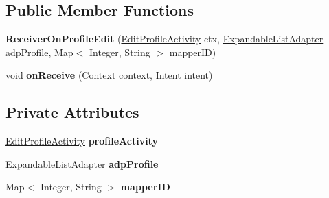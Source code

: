 \subsection*{Public Member Functions}
\begin{DoxyCompactItemize}
\item 
{\bfseries Receiver\+On\+Profile\+Edit} (\hyperlink{classcom_1_1example_1_1sebastian_1_1tindertp_1_1EditProfileActivity}{Edit\+Profile\+Activity} ctx, \hyperlink{classcom_1_1example_1_1sebastian_1_1tindertp_1_1ExpandedListAdapters_1_1ExpandableListAdapter}{Expandable\+List\+Adapter} adp\+Profile, Map$<$ Integer, String $>$ mapper\+ID)\hypertarget{classcom_1_1example_1_1sebastian_1_1tindertp_1_1services_1_1ReceiverOnProfileEdit_addf3c0ee92f912ac0227fc5437a80c5a}{}\label{classcom_1_1example_1_1sebastian_1_1tindertp_1_1services_1_1ReceiverOnProfileEdit_addf3c0ee92f912ac0227fc5437a80c5a}

\item 
void {\bfseries on\+Receive} (Context context, Intent intent)\hypertarget{classcom_1_1example_1_1sebastian_1_1tindertp_1_1services_1_1ReceiverOnProfileEdit_af526e15648381f6e0aa2ba5e14760c5d}{}\label{classcom_1_1example_1_1sebastian_1_1tindertp_1_1services_1_1ReceiverOnProfileEdit_af526e15648381f6e0aa2ba5e14760c5d}

\end{DoxyCompactItemize}
\subsection*{Private Attributes}
\begin{DoxyCompactItemize}
\item 
\hyperlink{classcom_1_1example_1_1sebastian_1_1tindertp_1_1EditProfileActivity}{Edit\+Profile\+Activity} {\bfseries profile\+Activity}\hypertarget{classcom_1_1example_1_1sebastian_1_1tindertp_1_1services_1_1ReceiverOnProfileEdit_a2528aa8d62a64623894fe0d5cae11151}{}\label{classcom_1_1example_1_1sebastian_1_1tindertp_1_1services_1_1ReceiverOnProfileEdit_a2528aa8d62a64623894fe0d5cae11151}

\item 
\hyperlink{classcom_1_1example_1_1sebastian_1_1tindertp_1_1ExpandedListAdapters_1_1ExpandableListAdapter}{Expandable\+List\+Adapter} {\bfseries adp\+Profile}\hypertarget{classcom_1_1example_1_1sebastian_1_1tindertp_1_1services_1_1ReceiverOnProfileEdit_a62af02081bd01fe81d04059f3cca4e66}{}\label{classcom_1_1example_1_1sebastian_1_1tindertp_1_1services_1_1ReceiverOnProfileEdit_a62af02081bd01fe81d04059f3cca4e66}

\item 
Map$<$ Integer, String $>$ {\bfseries mapper\+ID}\hypertarget{classcom_1_1example_1_1sebastian_1_1tindertp_1_1services_1_1ReceiverOnProfileEdit_a5a1a7eb3e3ad383dff46ff7971ace2cd}{}\label{classcom_1_1example_1_1sebastian_1_1tindertp_1_1services_1_1ReceiverOnProfileEdit_a5a1a7eb3e3ad383dff46ff7971ace2cd}

\end{DoxyCompactItemize}
